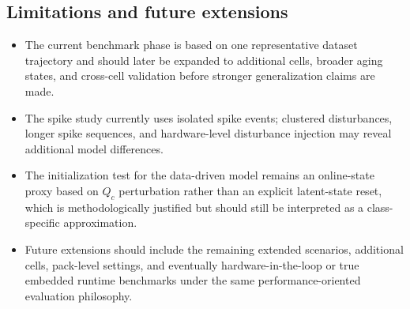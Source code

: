 \documentclass[review,nopreprintline]{elsarticle}
\begin{document}
\subsection{Limitations and future extensions}
\begin{itemize}[leftmargin=*]
    \item The current benchmark phase is based on one representative dataset trajectory and should later be expanded to additional cells, broader aging states, and cross-cell validation before stronger generalization claims are made.
    \item The spike study currently uses isolated spike events; clustered disturbances, longer spike sequences, and hardware-level disturbance injection may reveal additional model differences.
    \item The initialization test for the data-driven model remains an online-state proxy based on $Q_c$ perturbation rather than an explicit latent-state reset, which is methodologically justified but should still be interpreted as a class-specific approximation.
    \item Future extensions should include the remaining extended scenarios, additional cells, pack-level settings, and eventually hardware-in-the-loop or true embedded runtime benchmarks under the same performance-oriented evaluation philosophy.
\end{itemize}
\end{document}
